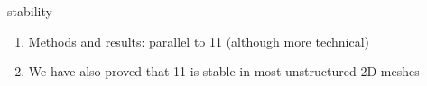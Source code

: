 


\begin{frame}{
    stability}
  \begin{enumerate}\itemsep0.66em
  \item Methods and results: parallel to 11
    (although more technical)
  \item We have also proved that 11 is stable in
    most unstructured 2D meshes
  \end{enumerate}
\end{frame}

